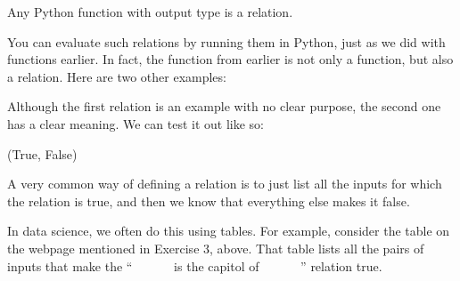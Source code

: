 \documentclass[letterpaper,10pt,english]{sphinxmanual}
\begin{document}
 Any Python function with output type  is a relation.

You can evaluate such relations by running them in Python, just as we did with functions earlier.  In fact, the  function from earlier is not only a function, but also a relation.  Here are two other examples:

\begin{sphinxVerbatim}[commandchars=\\\{\}]
     
       \PYG{p}{[}\PYG{p}{]}

    
       \PYG{p}{[}\PYG{p}{]}
\end{sphinxVerbatim}

Although the first relation is an example with no clear purpose, the second one has a clear meaning.  We can test it out like so:

\begin{sphinxVerbatim}[commandchars=\\\{\}]
     
\end{sphinxVerbatim}

\begin{sphinxVerbatim}[commandchars=\\\{\}]
(True, False)
\end{sphinxVerbatim}

 A very common way of defining a relation is to just list all the inputs for which the relation is true, and then we know that everything else makes it false.

In data science, we often do this using tables.  For example, consider the table on the webpage mentioned in Exercise 3, above.  That table lists all the pairs of inputs that make the “        is the capitol of        ” relation true.
\end{document}
